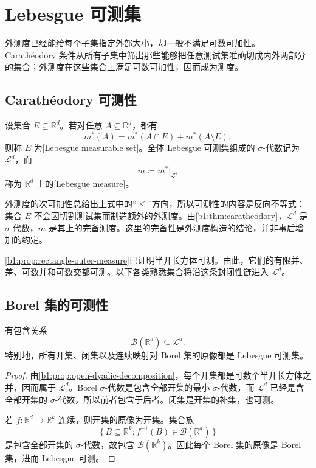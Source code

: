 \section{Lebesgue 可测集}
\label{b1:sec:0302}

外测度已经能给每个子集指定外部大小，却一般不满足可数可加性。Carathéodory 条件从所有子集中筛出那些能够把任意测试集准确切成内外两部分的集合；外测度在这些集合上满足可数可加性，因而成为测度。

\subsection{Carathéodory 可测性}
\label{b1:subsec:030201}

\begin{definition}
\label{b1:def:lebesgue-measurable}
设集合 \(E\subseteq\mathbb R^d\)。若对任意 \(A\subseteq\mathbb R^d\)，都有
\[
m^*(A)=m^*(A\cap E)+m^*(A\setminus E),
\]
则称 \(E\) 为[Lebesgue measurable set]。全体 Lebesgue 可测集组成的 \(\sigma\)-代数记为 \(\mathcal L^d\)，而
\[
m\coloneqq m^*|_{\mathcal L^d}
\]
称为 \(\mathbb R^d\) 上的[Lebesgue measure]。
\end{definition}

外测度的次可加性总给出上式中的“\(\leq\)”方向，所以可测性的内容是反向不等式：集合 \(E\) 不会因切割测试集而制造额外的外测度。由\cref{b1:thm:caratheodory}，\(\mathcal L^d\) 是 \(\sigma\)-代数，\(m\) 是其上的完备测度。这里的完备性是外测度构造的结论，并非事后增加的约定。%

\ProseParagraphBreak

\cref{b1:prop:rectangle-outer-measure}已证明半开长方体可测。由此，它们的有限并、差、可数并和可数交都可测。以下各类熟悉集合将沿这条封闭性链进入 \(\mathcal L^d\)。

\subsection{Borel 集的可测性}
\label{b1:subsec:030202}

\begin{theorem}
\label{b1:thm:borel-lebesgue}
有包含关系
\[
\mathcal B(\mathbb R^d)\subseteq\mathcal L^d.
\]
特别地，所有开集、闭集以及连续映射对 Borel 集的原像都是 Lebesgue 可测集。
\end{theorem}
\begin{proof}
由\cref{b1:prop:open-dyadic-decomposition}，每个开集都是可数个半开长方体之并，因而属于 \(\mathcal L^d\)。Borel \(\sigma\)-代数是包含全部开集的最小 \(\sigma\)-代数，而 \(\mathcal L^d\) 已经是含全部开集的 \(\sigma\)-代数，所以前者包含于后者。闭集是开集的补集，也可测。

若 \(f:\mathbb R^d\to\mathbb R^k\) 连续，则开集的原像为开集。集合族
\[
\{\,B\subseteq\mathbb R^k:f^{-1}(B)\in\mathcal B(\mathbb R^d)\,\}
\]
是包含全部开集的 \(\sigma\)-代数，故包含 \(\mathcal B(\mathbb R^k)\)。因此每个 Borel 集的原像是 Borel 集，进而 Lebesgue 可测。
\end{proof}


